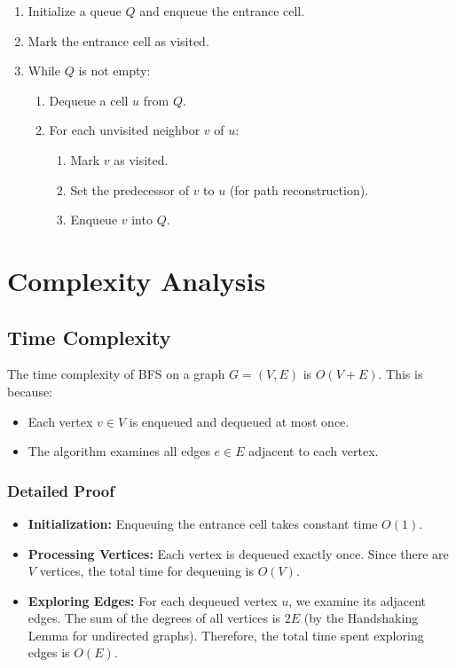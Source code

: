 \documentclass{article}
\begin{document}
\begin{enumerate}
    \item Initialize a queue \(Q\) and enqueue the entrance cell.
    \item Mark the entrance cell as visited.
    \item While \(Q\) is not empty:
    \begin{enumerate}
        \item Dequeue a cell \(u\) from \(Q\).
        \item For each unvisited neighbor \(v\) of \(u\):
        \begin{enumerate}
            \item Mark \(v\) as visited.
            \item Set the predecessor of \(v\) to \(u\) (for path reconstruction).
            \item Enqueue \(v\) into \(Q\).
        \end{enumerate}
    \end{enumerate}
\end{enumerate}

\section*{Complexity Analysis}

\subsection*{Time Complexity}

The time complexity of BFS on a graph \(G = (V, E)\) is \(O(V + E)\). This is because:

\begin{itemize}
    \item Each vertex \(v \in V\) is enqueued and dequeued at most once.
    \item The algorithm examines all edges \(e \in E\) adjacent to each vertex.
\end{itemize}

\subsubsection*{Detailed Proof}

\begin{itemize}
    \item \textbf{Initialization:} Enqueuing the entrance cell takes constant time \(O(1)\).
    \item \textbf{Processing Vertices:} Each vertex is dequeued exactly once. Since there are \(V\) vertices, the total time for dequeuing is \(O(V)\).
    \item \textbf{Exploring Edges:} For each dequeued vertex \(u\), we examine its adjacent edges. The sum of the degrees of all vertices is \(2E\) (by the Handshaking Lemma for undirected graphs). Therefore, the total time spent exploring edges is \(O(E)\).
\end{itemize}
\end{document}
